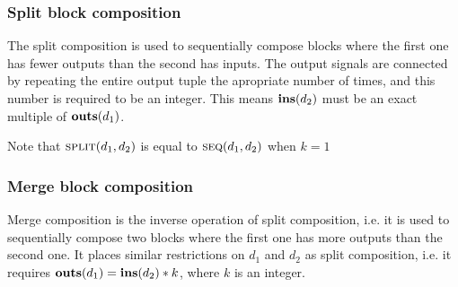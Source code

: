 \subsubsection{Split block composition}
The split composition is used to sequentially compose blocks where the first one has fewer outputs than the
second has inputs. The output signals are connected by repeating the entire output tuple the apropriate
number of times, and this number is required to be an integer. This means $\Ins(d_2)$ must be an
exact multiple of $\Outs(d_1)$. \newcommand{\Mod}{\mathrm{\ mod\ }}
\begin{minipage}{0.5\linewidth}
  \begin{prooftree}
  \end{prooftree}
  \begin{prooftree}
  \end{prooftree}\end{minipage}
\begin{minipage}{0.5\linewidth}
  \begin{figure}[H]
    \centering
    \label{fig:block_split}
    
  \end{figure}
\end{minipage}

Note that $\Split(d_1, d_2)$ is equal to $\Sequential(d_1, d_2)$ when $k = 1$

\subsubsection{Merge block composition}

Merge composition is the inverse operation of split composition, i.e. it is used to sequentially compose two
blocks where the first one has more outputs than the second one. It places similar restrictions on
$d_1$ and $d_2$ as split composition, i.e. it requires
$\Outs(d_1) = \Ins(d_2) * k$, where $k$ is an integer.

